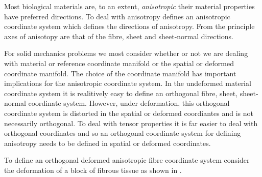 Most biological materials are, to an extent,
\emph{anisotropic} \ie their material properties have
preferred directions. To deal with anisotropy \OpenCMISS defines an
anisotropic coordinate system which defines the directions of
anisotropy. From  the
principle axes of anisotopy are that of the fibre, sheet and
sheet-normal directions.

For solid mechanics problems we most consider whether or not we are
dealing with material or reference coordinate manifold or the spatial
or deformed coordinate manifold. The choice of the coordinate manifold
has important implications for the anisotropic coordinate system. In
the undeformed material coordinate system it is realitively easy to
define an orthogonal fibre, sheet, sheet-normal coordinate
system. However, under deformation, this orthogonal coordinate system
is distorted in the spatial or deformed coordiantes and is not
necessarily orthogonal. To deal with tensor properties it is far
easier to deal with orthogonal coordinates and so an orthogonal
coordinate system for defining anisotropy needs to be defined in
spatial or deformed coordinates.

To define an orthogonal deformed anisotropic fibre coordinate system
consider the deformation of a block of fibrous tissue as shown in
.

